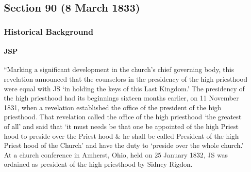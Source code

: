 \subsection{Section 90 (8 March 1833)}
	\label{DC90}
	
	\subsubsection{Historical Background}
		\label{DC90-HB}
		
		\paragraph{JSP}
		
			``Marking a significant development in the church's chief governing body, this revelation announced that the counselors in the presidency of the high priesthood were equal with JS `in holding the keys of this Last Kingdom.' The presidency of the high priesthood had its beginnings sixteen months earlier, on 11 November 1831, when a revelation established the office of the president of the high priesthood. That revelation called the office of the high priesthood `the greatest of all' and said that `it must needs be that one be appointed of the high Priest hood to preside over the Priest hood \& he shall be called President of the high Priest hood of the Church' and have the duty to `preside over the whole church.' At a church conference in Amherst, Ohio, held on 25 January 1832, JS was ordained as president of the high priesthood by Sidney Rigdon.
			
